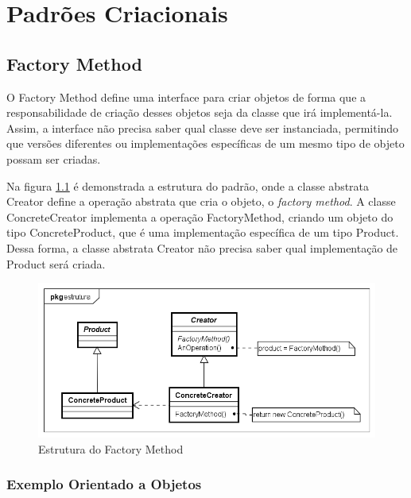 \chapter{Padrões Criacionais}

\section{Factory Method}

O Factory Method define uma interface para criar 
objetos de forma que a responsabilidade de criação 
desses objetos seja da classe que irá implementá-la. 
Assim, a interface não precisa saber qual 
classe deve ser instanciada, permitindo que versões 
diferentes ou implementações específicas de um mesmo 
tipo de objeto possam ser criadas.

Na figura \ref{fmethod_struct} é demonstrada 
a estrutura do padrão, onde a classe abstrata Creator 
define a operação abstrata que cria o objeto, 
o \textit{factory method}. A classe ConcreteCreator 
implementa a operação FactoryMethod, criando um objeto 
do tipo ConcreteProduct, que é uma implementação 
específica de um tipo Product. Dessa forma, a classe 
abstrata Creator não precisa saber qual implementação 
de Product será criada.

\begin{figure}[htb]
	\caption{\label{fmethod_struct}Estrutura do Factory Method}
	\begin{center}
	    \includegraphics[scale=0.5]{5_padroes-contexto-funcional/5.1_criacionais/5.1.1_factory-method/factorymethod_struct.png}
	\end{center}
\end{figure}


\subsection*{Exemplo Orientado a Objetos}

